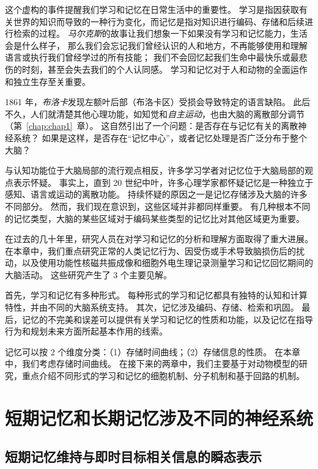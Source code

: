 这个虚构的事件提醒我们学习和记忆在日常生活中的重要性。
学习是指因获取有关世界的知识而导致的一种行为变化，而记忆是指对知识进行编码、存储和后续进行检索的过程。
\textit{马尔克斯}的故事让我们想象一下如果没有学习和记忆能力，生活会是什么样子，
那么我们会忘记我们曾经认识的人和地方，不再能够使用和理解语言或执行我们曾经学过的所有技能；
我们不会回忆起我们生命中最快乐或最悲伤的时刻，甚至会失去我们的个人认同感。
学习和记忆对于人和动物的全面运作和独立生存至关重要。


1861 年，\textit{布洛卡}发现左额叶后部（布洛卡区）受损会导致特定的语言缺陷。
此后不久，人们就清楚其他心理功能，如知觉和\textit{自主运动}，也由大脑的离散部分调节（第~\ref{chap:chap1}~章）。
这自然引出了一个问题：是否存在与记忆有关的离散神经系统？
如果是这样，是否存在“记忆中心”，或者记忆处理是否广泛分布于整个大脑？


与认知功能位于大脑局部的流行观点相反，许多学习学者对记忆位于大脑局部的观点表示怀疑。
事实上，直到 20 世纪中叶，许多心理学家都怀疑记忆是一种独立于感知、语言或运动的离散功能。
持续怀疑的原因之一是记忆存储涉及大脑的许多不同部分。
然而，我们现在意识到，这些区域并非都同样重要。
有几种根本不同的记忆类型，大脑的某些区域对于编码某些类型的记忆比对其他区域更为重要。


在过去的几十年里，研究人员在对学习和记忆的分析和理解方面取得了重大进展。
在本章中，我们重点研究正常的人类记忆行为、因受伤或手术导致脑损伤后的扰动，以及使用功能性核磁共振成像和细胞外电生理记录测量学习和记忆回忆期间的大脑活动。
这些研究产生了 3 个主要见解。


首先，学习和记忆有多种形式。
每种形式的学习和记忆都具有独特的认知和计算特性，并由不同的大脑系统支持。
其次，记忆涉及编码、存储、检索和巩固。
最后，记忆的不完美和误差可以提供有关学习和记忆的性质和功能，以及记忆在指导行为和规划未来方面所起基本作用的线索。


记忆可以按 2 个维度分类：（1）存储时间曲线；（2）存储信息的性质。
在本章中，我们考虑存储时间曲线。
在接下来的两章中，我们主要基于对动物模型的研究，重点介绍不同形式的学习和记忆的细胞机制、分子机制和基于回路的机制。



\section{短期记忆和长期记忆涉及不同的神经系统}

\subsection{短期记忆维持与即时目标相关信息的瞬态表示}

